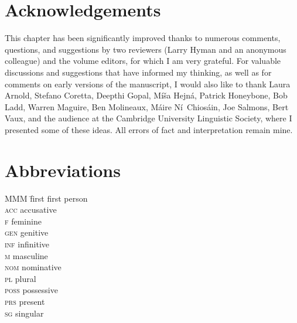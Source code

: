 \documentclass[output=paper,colorlinks,citecolor=brown]{langscibook}
\begin{document}
\section*{Acknowledgements}
\label{sec:acknowledgements}

This chapter has been significantly improved thanks to numerous comments, questions, and suggestions by two reviewers (Larry Hyman and an anonymous colleague) and the volume editors, for which I am very grateful. For valuable discussions and suggestions that have informed my thinking, as well as for comments on early versions of the manuscript, I would also like to thank Laura Arnold, Stefano Coretta, Deepthi Gopal, Míša Hejná, Patrick Honeybone, Bob Ladd, Warren Maguire, Ben Molineaux, Máire Ní~Chiosáin, Joe Salmons, Bert Vaux, and the audience at the Cambridge University Linguistic Society, where I presented some of these ideas. All errors of fact and interpretation remain mine.

\section*{Abbreviations}
\label{sec:abbreviations}

\begin{multicols}{3}
\begin{tabbing}
MMM \= first \> first person\\
\textsc{acc}  \> accusative\\
\textsc{f}    \> feminine\\
\textsc{gen}  \> genitive\\
\textsc{inf}  \> infinitive\\
\textsc{m}    \> masculine\\
\textsc{nom}  \> nominative\\
\textsc{pl}   \> plural\\
\textsc{poss} \> possessive\\
\textsc{prs}  \> present\\
\textsc{sg}   \> singular
\end{tabbing}
\end{multicols}


\printbibliography[heading=subbibliography,notkeyword=this]
\end{document}
